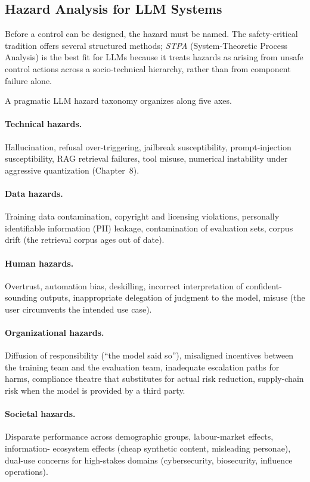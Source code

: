 \subsection{Hazard Analysis for LLM Systems}

Before a control can be designed, the hazard must be named. The
safety-critical tradition offers several structured methods;
\emph{STPA} (System-Theoretic Process Analysis)
\citep{leveson2011engineering} is the best fit for LLMs because
it treats hazards as arising from unsafe control actions across
a socio-technical hierarchy, rather than from component failure
alone.

A pragmatic LLM hazard taxonomy organizes along five axes.

\paragraph{Technical hazards.} Hallucination, refusal
over-triggering, jailbreak susceptibility, prompt-injection
susceptibility, RAG retrieval failures, tool misuse, numerical
instability under aggressive quantization (Chapter~8).

\paragraph{Data hazards.} Training data contamination,
copyright and licensing violations, personally identifiable
information (PII) leakage, contamination of evaluation sets,
corpus drift (the retrieval corpus ages out of date).

\paragraph{Human hazards.} Overtrust, automation bias,
deskilling, incorrect interpretation of confident-sounding
outputs, inappropriate delegation of judgment to the model,
misuse (the user circumvents the intended use case).

\paragraph{Organizational hazards.} Diffusion of responsibility
(``the model said so''), misaligned incentives between the
training team and the evaluation team, inadequate escalation
paths for harms, compliance theatre that substitutes for
actual risk reduction, supply-chain risk when the model is
provided by a third party.

\paragraph{Societal hazards.} Disparate performance across
demographic groups, labour-market effects, information-
ecosystem effects (cheap synthetic content, misleading
personae), dual-use concerns for high-stakes domains
(cybersecurity, biosecurity, influence operations).

